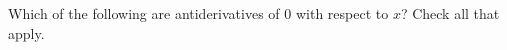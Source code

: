\documentclass{ximera}
\author{Steven Gubkin}
\begin{document}
\begin{exercise}



Which of the following are antiderivatives of $0$ with respect to $x$?  Check all that apply.

\begin{selectAll}
\end{selectAll}



\end{exercise}
\end{document}
